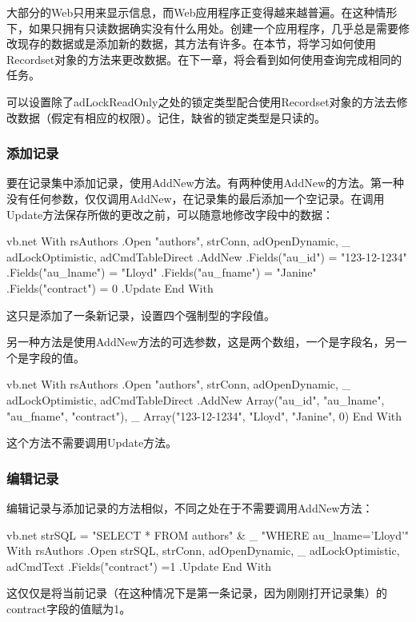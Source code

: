        大部分的Web只用来显示信息，而Web应用程序正变得越来越普遍。在这种情形下，如果只拥有只读数据确实没有什么用处。创建一个应用程序，几乎总是需要修改现存的数据或是添加新的数据，其方法有许多。在本节，将学习如何使用Recordset对象的方法来更改数据。在下一章，将会看到如何使用查询完成相同的任务。

       可以设置除了adLockReadOnly之处的锁定类型配合使用Recordset对象的方法去修改数据（假定有相应的权限）。记住，缺省的锁定类型是只读的。

\subsubsection{添加记录}

要在记录集中添加记录，使用AddNew方法。有两种使用AddNew的方法。第一种没有任何参数，仅仅调用AddNew，在记录集的最后添加一个空记录。在调用Update方法保存所做的更改之前，可以随意地修改字段中的数据：
\begin{amzcode}{vb.net}
With rsAuthors
	.Open "authors", strConn, adOpenDynamic, _
		adLockOptimistic, adCmdTableDirect
	.AddNew
    .Fields("au_id") = "123-12-1234"
    .Fields("au_lname") = "Lloyd"
    .Fields("au_fname") = "Janine"
    .Fields("contract") = 0
	.Update
End With
\end{amzcode}
这只是添加了一条新记录，设置四个强制型的字段值。

另一种方法是使用AddNew方法的可选参数，这是两个数组，一个是字段名，另一个是字段的值。
\begin{amzcode}{vb.net}
With rsAuthors
   .Open "authors", strConn, adOpenDynamic, _
   adLockOptimistic, adCmdTableDirect
   .AddNew Array("au_id", "au_lname", "au_fname", "contract"), _
                 Array("123-12-1234", "Lloyd", "Janine", 0)
End With
\end{amzcode}
这个方法不需要调用Update方法。

\subsubsection{编辑记录}

编辑记录与添加记录的方法相似，不同之处在于不需要调用AddNew方法：
\begin{amzcode}{vb.net}
strSQL = "SELECT * FROM authors" & _
              "WHERE au_lname='Lloyd'"
With rsAuthors
   .Open strSQL, strConn, adOpenDynamic, _
          adLockOptimistic, adCmdText
   .Fields("contract") =1
   .Update
End With
\end{amzcode}
这仅仅是将当前记录（在这种情况下是第一条记录，因为刚刚打开记录集）的contract字段的值赋为1。

